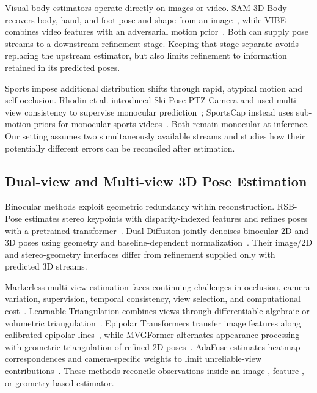 \documentclass[preprint,12pt]{elsarticle}
\begin{document}
Visual body estimators operate directly on images or video. SAM 3D Body recovers body, hand, and foot pose and shape from an image~\cite{yang2026sam}, while VIBE combines video features with an adversarial motion prior~\cite{kocabas2020vibe}. Both can supply pose streams to a downstream refinement stage. Keeping that stage separate avoids replacing the upstream estimator, but also limits refinement to information retained in its predicted poses.

Sports impose additional distribution shifts through rapid, atypical motion and self-occlusion. Rhodin et al. introduced Ski-Pose PTZ-Camera and used multi-view consistency to supervise monocular prediction~\cite{rhodin2018learning}; SportsCap instead uses sub-motion priors for monocular sports videos~\cite{chen2021sportscap}. Both remain monocular at inference. Our setting assumes two simultaneously available streams and studies how their potentially different errors can be reconciled after estimation.

\subsection{Dual-view and Multi-view 3D Pose Estimation}
Binocular methods exploit geometric redundancy within reconstruction. RSB-Pose estimates stereo keypoints with disparity-indexed features and refines poses with a pretrained transformer~\cite{wan2025rsb}. Dual-Diffusion jointly denoises binocular 2D and 3D poses using geometry and baseline-dependent normalization~\cite{wan2024dualdiffusion}. Their image/2D and stereo-geometry interfaces differ from refinement supplied only with predicted 3D streams.

Markerless multi-view estimation faces continuing challenges in occlusion, camera variation, supervision, temporal consistency, view selection, and computational cost~\cite{nogueira2025survey}. Learnable Triangulation combines views through differentiable algebraic or volumetric triangulation~\cite{iskakov2019learnable}. Epipolar Transformers transfer image features along calibrated epipolar lines~\cite{he2020epipolar}, while MVGFormer alternates appearance processing with geometric triangulation of refined 2D poses~\cite{liao2024multiple}. AdaFuse estimates heatmap correspondences and camera-specific weights to limit unreliable-view contributions~\cite{zhang2021adafuse}. These methods reconcile observations inside an image-, feature-, or geometry-based estimator.
\end{document}
